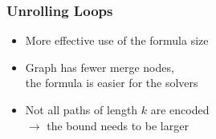 \begin{frame}
\frametitle{Unrolling Loops}

\begin{itemize}

\item[\mycheck] More effective use of the formula size
\vfill

\item[\mycheck] Graph has fewer merge nodes,\\
the formula is easier for the solvers
\vfill

\item[\myfail] Not all paths of length $k$ are encoded\\
$\rightarrow$ the bound needs to be larger

\end{itemize}

\end{frame}


\lstset{language=C,basicstyle=\rmfamily,escapechar=\$,columns=flexible}

